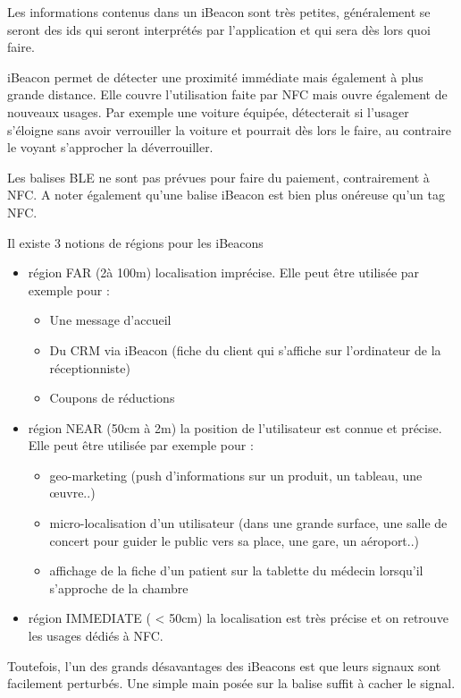 \documentclass[francais,12pt]{article}
\begin{document}
	Les informations contenus dans un iBeacon sont très petites, généralement se seront des ids qui seront interprétés par l'application et qui sera dès lors quoi faire.
	
	iBeacon permet de détecter une proximité immédiate mais également à plus grande distance. Elle couvre l'utilisation faite par NFC mais ouvre également de nouveaux usages. Par exemple une voiture équipée, détecterait si l'usager s'éloigne sans avoir verrouiller la voiture et pourrait dès lors le faire, au contraire le voyant s'approcher la déverrouiller.
	
	Les balises BLE ne sont pas prévues pour faire du paiement, contrairement à NFC. A noter également qu'une balise iBeacon est bien plus onéreuse qu'un tag NFC.
	
	Il existe 3 notions de régions pour les iBeacons
	\begin{itemize}
		\item région FAR (2à 100m) localisation imprécise. Elle peut être utilisée par exemple pour :
		\begin{itemize}
			\item Une message d'accueil
			\item Du CRM via iBeacon (fiche du client qui s'affiche sur l'ordinateur de la réceptionniste)
			\item Coupons de réductions
		\end{itemize}
		\item région NEAR (50cm à 2m) la position de l'utilisateur est connue et précise. Elle peut être utilisée par exemple pour :
		\begin{itemize}
			\item geo-marketing (push d'informations sur un produit, un tableau, une œuvre..)
			\item micro-localisation d'un utilisateur (dans une grande surface, une salle de concert pour guider le public vers sa place, une gare, un aéroport..)
			\item affichage de la fiche d'un patient sur la tablette du médecin lorsqu'il s'approche de la chambre
		\end{itemize}
		\item région IMMEDIATE ( < 50cm) la localisation est très précise et on retrouve les usages dédiés à NFC.
	\end{itemize}

		Toutefois, l'un des grands désavantages des iBeacons est que leurs signaux sont facilement perturbés. Une simple main posée sur la balise suffit à cacher le signal. 
	
\end{document}
